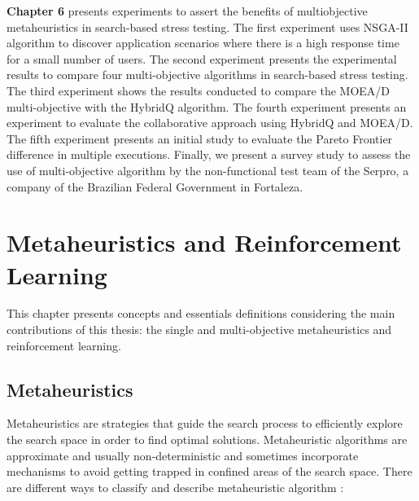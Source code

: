 \documentclass[espaco=umemeio,chapter=TITLE,twoside,openright]{abnt}
\begin{document}
\textbf{Chapter 6} presents experiments to assert the benefits of multiobjective metaheuristics in search-based stress testing. The first experiment uses NSGA-II algorithm to discover application scenarios where there is a high response time for a small number of users. The second experiment presents the experimental results to compare four multi-objective algorithms in search-based stress testing. The third experiment shows the results conducted to compare the MOEA/D multi-objective with the HybridQ algorithm.  The fourth experiment presents an experiment to evaluate the collaborative approach using HybridQ and MOEA/D. The fifth experiment presents an initial study to evaluate the Pareto Frontier difference in multiple executions. Finally, we present a survey study to assess the use of multi-objective algorithm by the non-functional test team of the Serpro, a company of the Brazilian Federal Government in Fortaleza. 

\chapter{Metaheuristics and Reinforcement Learning}

This chapter presents concepts and essentials definitions considering the main contributions of this thesis: the single and multi-objective metaheuristics and reinforcement learning. 

\section{Metaheuristics}

Metaheuristics are strategies that guide the search process to efficiently explore the search space in order to find optimal solutions. Metaheuristic algorithms are approximate and usually non-deterministic and sometimes incorporate mechanisms to avoid getting trapped in confined areas of the search space. There are different ways to classify and describe metaheuristic algorithm \cite{Blum2003}:
\end{document}
